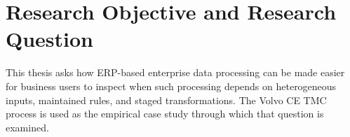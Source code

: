 









\section{Research Objective and Research Question}

This thesis asks how ERP-based enterprise data processing can be made easier for business users to inspect when such processing depends on heterogeneous inputs, maintained rules, and staged transformations. The Volvo CE TMC process is used as the empirical case study through which that question is examined.

